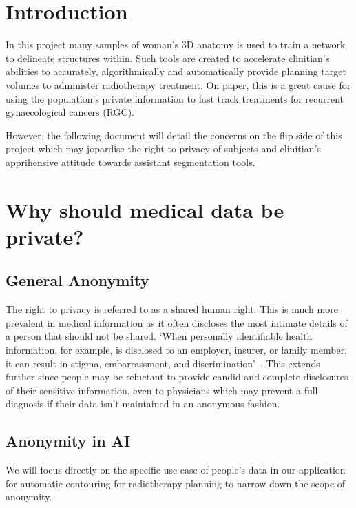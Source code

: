 \documentclass[11pt]{article}
\begin{document}


\tableofcontents

\clearpage

\section{Introduction}

In this project many samples of woman's 3D anatomy is used to train a network to delineate structures within. Such tools are created to accelerate clinitian's abilities to accurately, algorithmically and automatically provide planning target volumes to administer radiotherapy treatment. On paper, this is a great cause for using the population's private information to fast track treatments for recurrent gynaecological cancers (RGC).

However, the following document will detail the concerns on the flip side of this project which may jopardise the right to privacy of subjects and clinitian's apprihensive attitude towards assistant segmentation tools.

\section{Why should medical data be private?}

\subsection{General Anonymity}

The right to privacy is referred to as a shared human right. This is much more prevalent in medical information as it often discloses the most intimate details of a person that should not be shared. `When personally identifiable health information, for example, is disclosed to an employer, insurer, or family member, it can result in stigma, embarrassment, and discrimination'~\cite{health-privacy}. This extends further since people may be reluctant to provide candid and complete disclosures of their sensitive information, even to physicians which may prevent a full diagnosis if their data isn't maintained in an anonymous fashion.

\subsection{Anonymity in AI}

We will focus directly on the specific use case of people's data in our application for automatic contouring for radiotherapy planning to narrow down the scope of anonymity.
\end{document}
